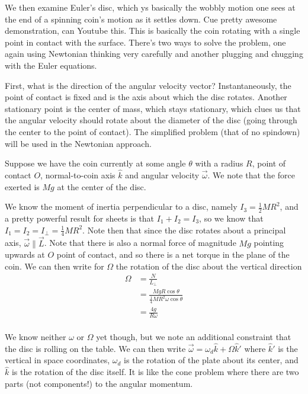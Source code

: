 \documentclass[10pt]{report}
\begin{document}
We then examine Euler's disc, which ys basically the wobbly motion one sees at the end of a spinning coin's motion as it settles down. Cue pretty awesome demonstration, can Youtube this. This is basically the coin rotating with a single point in contact with the surface. There's two ways to solve the problem, one again using Newtonian thinking very carefully and another plugging and chugging with the Euler equations. 

First, what is the direction of the angular velocity vector? Instantaneously, the point of contact is fixed and is the axis about which the disc rotates. Another stationary point is the center of mass, which stays stationary, which clues us that the angular velocity should rotate about the diameter of the disc (going through the center to the point of contact). The simplified problem (that of no spindown) will be used in the Newtonian approach.

Suppose we have the coin currently at some angle $\theta$ with a radius $R$, point of contact $O$, normal-to-coin axis $\hat{k}$ and angular velocity $\vec{\omega}$. We note that the force exerted is $Mg$ at the center of the disc.

We know the moment of inertia perpendicular to a disc, namely $I_3 = \frac{1}{2}MR^2$, and a pretty powerful result for sheets is that $I_1 + I_2 = I_3$, so we know that $I_1 = I_2 = I_\perp = \frac{1}{4}MR^2$. Note then that since the disc rotates about a principal axis, $\vec{\omega} \parallel \vec{L}$. Note that there is also a normal force of magnitude $Mg$ pointing upwards at $O$ point of contact, and so there is a net torque in the plane of the coin. We can then write for $\Omega$ the rotation of the disc about the vertical direction
\begin{align*}
    \Omega &= \frac{N}{L_\perp}\\
    &= \frac{MgR\cos \theta}{\frac{1}{4}MR^2\omega \cos \theta}\\
    &= \frac{4g}{R\omega}\\
\end{align*}

We know neither $\omega$ or $\Omega$ yet though, but we note an additional constraint that the disc is rolling on the table. We can then write $\vec{\omega} = \omega_d \hat{k} + \Omega \hat{k}'$ where $\hat{k}'$ is the vertical in space coordinates, $\omega_d$ is the rotation of the plate about its center, and $\hat{k}$ is the rotation of the disc itself. It is like the cone problem where there are two parts (not components!) to the angular momentum.
\end{document}
